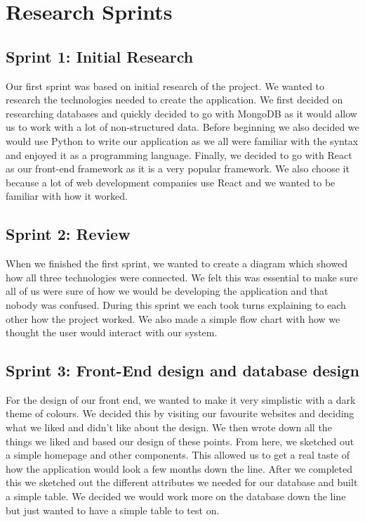 \section{Research Sprints}
\subsection{Sprint 1: Initial Research}
Our first sprint was based on initial research of the project. We wanted to research the technologies needed to create the application. We first decided on researching databases and quickly decided to go with MongoDB as it would allow us to work with a lot of non-structured data. Before beginning we also decided we would use Python to write our application as we all were familiar with the syntax and enjoyed it as a programming language. Finally, we decided to go with React as our front-end framework as it is a very popular framework. We also choose it because a lot of web development companies use React and we wanted to be familiar with how it worked.

\subsection{Sprint 2: Review}
When we finished the first sprint, we wanted to create a diagram which showed how all three technologies were connected. We felt this was essential to make sure all of us were sure of how we would be developing the application and that nobody was confused. During this sprint we each took turns explaining to each other how the project worked. We also made a simple flow chart with how we thought the user would interact with our system.

\subsection{Sprint 3: Front-End design and database design}
For the design of our front end, we wanted to make it very simplistic with a dark theme of colours. We decided this by visiting our favourite websites and deciding what we liked and didn’t like about the design. We then wrote down all the things we liked and based our design of these points. From here, we sketched out a simple homepage and other components. This allowed us to get a real taste of how the application would look a few months down the line. After we completed this we sketched out the different attributes we needed for our database and built a simple table. We decided we would work more on the database down the line but just wanted to have a simple table to test on.

